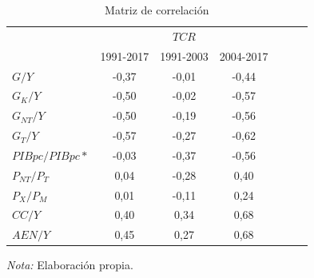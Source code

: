 \documentclass[12pt,letterpaper]{article}
\begin{document}
\begin{table}
\caption{Matriz de correlación}
\begin{center}
\begin{tabular}{lcccccc}									

\hline													
\hline
	&	\multicolumn{3}{c}{$TCR$}\\					
	&	1991-2017	&	1991-2003	&	2004-2017	\\
\hline							
$G/Y$	&	-0,37	&	-0,01	&	-0,44	\\
$G_{K}/Y$	&	-0,50	&	-0,02	&	-0,57	\\
$G_{NT}/Y$	&	-0,50	&	-0,19	&	-0,56	\\
$G_{T}/Y$	&	-0,57	&	-0,27	&	-0,62	\\
$PIBpc/PIBpc*$	&	-0,03	&	-0,37	&	-0,56	\\
$P_{NT}/P_T$	&	0,04	&	-0,28	&	0,40	\\
$P_X/P_M$	&	0,01	&	-0,11	&	0,24	\\
$CC/Y$	&	0,40	&	0,34	&	0,68	\\
$AEN/Y$	&	0,45	&	0,27	&	0,68	\\
							
\hline													
\hline									
\end{tabular}	
\end{center}						
\begin{scriptsize}
\emph{Nota:} Elaboración propia.
\end{scriptsize}	
\label{correbeer}	
\end{table}						
\end{document}
